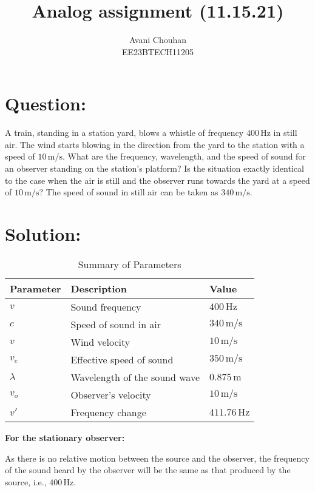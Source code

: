 \documentclass[twocolumn]{article}
\title{Analog assignment (11.15.21)}
\author{Avani Chouhan \\
        EE23BTECH11205}
\date{}  %
\begin{document}
\maketitle

\section*{Question:}
A train, standing in a station yard, blows a whistle of frequency $400 \, \text{Hz}$ in still air. The wind starts blowing in the direction from the yard to the station with a speed of $10 \, \text{m/s}$. What are the frequency, wavelength, and the speed of sound for an observer standing on the station's platform? Is the situation exactly identical to the case when the air is still and the observer runs towards the yard at a speed of $10\, \text{m/s}$? The speed of sound in still air can be taken as $340\, \text{m/s}$.

\section*{Solution:}
\begin{table}[htbp]
  \centering
  \caption{Summary of Parameters}
  \label{tab:parameters}
  \begin{tabularx}{\linewidth}{|X|X|X|}
    \hline
    \textbf{Parameter} & \textbf{Description} & \textbf{Value} \\
    \hline
    $v$ & Sound frequency & $400 \, \text{Hz}$ \\
    \hline
    $c$ & Speed of sound in air & $340 \, \text{m/s}$ \\
    \hline
    $v$& Wind velocity & $10 \, \text{m/s}$ \\
    \hline
    $v_e$ & Effective speed of sound & $350 \, \text{m/s}$ \\
    \hline
    $\lambda$ & Wavelength of the sound wave & $0.875 \, \text{m}$ \\
    \hline
    $v_o$ & Observer's velocity & $10 \, \text{m/s}$ \\
    \hline
    $v'$ & Frequency change & $411.76 \, \text{Hz}$ \\
    \hline
  \end{tabularx}
\end{table}

\textbf{For the stationary observer:}

As there is no relative motion between the source and the observer, the frequency of the sound heard by the observer will be the same as that produced by the source, i.e., $400 \, \text{Hz}$.
\end{document}
